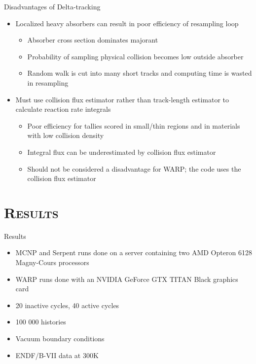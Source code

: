 \documentclass[xcolor=x11names, compress, handout]{beamer}
\renewcommand{\(}{\begin{columns}}
\renewcommand{\)}{\end{columns}}
\newcommand{\<}[1]{\begin{column}{#1}}
\renewcommand{\>}{\end{column}}
\begin{document}
\begin{frame}{Disadvantages of Delta-tracking \cite{serpent}}
	\begin{itemize}
        \item{Localized heavy absorbers can result in poor efficiency of resampling loop}
                \begin{itemize}
                \pause
                \item{Absorber cross section dominates majorant}
                \item{Probability of sampling physical collision becomes low outside absorber}
                \item{Random walk is cut into many short tracks and computing time is wasted in 
		resampling}
                \end{itemize}
	\pause
	\vspace*{1 em}
	\item{Must use collision flux estimator rather than track-length estimator to calculate reaction 
	rate integrals}
		\begin{itemize}
		\pause
		\item{Poor efficiency for tallies scored in small/thin regions and in materials with low 
		collision density}
		\item{Integral flux can be underestimated by collision flux estimator}
		\item{Should not be considered a disadvantage for WARP; the code uses the collision flux 
		estimator}
		\end{itemize}
	\end{itemize}
\end{frame}


\section{\scshape Results}
\begin{frame}{Results}
	\begin{itemize}
	\item{MCNP and Serpent runs done on a server containing two AMD Opteron 6128 Magny-Cours 
	processors}
	\item{WARP runs done with an NVIDIA GeForce GTX TITAN Black graphics card}
	\item{20 inactive cycles, 40 active cycles}
	\item{100 000 histories}
	\item{Vacuum boundary conditions}
	\item{ENDF/B-VII data at 300K}
	\end{itemize}
\end{frame}
\end{document}

